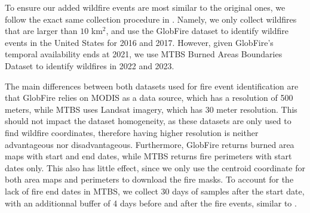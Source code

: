 To ensure our added wildfire events are most similar to the original ones, we follow the exact same collection procedure in \cite{gerard2023wildfirespreadts}. Namely, we only collect wildfires that are larger than $10$ km$^2$, and use the GlobFire dataset \cite{artes2019global} to identify wildfire events in the United States for 2016 and 2017. However, given GlobFire's temporal availability ends at 2021, we use MTBS Burned Areas Boundaries Dataset \cite{MTBS_2017} to identify wildfires in 2022 and 2023.

The main differences between both datasets used for fire event identification are that GlobFire relies on MODIS \cite{giglio2021modis} as a data source, which has a resolution of 500 meters, while MTBS uses Landsat imagery, which has 30 meter resolution. This should not impact the dataset homogeneity, as these datasets are only used to find wildfire coordinates, therefore having higher resolution is neither advantageous nor disadvantageous. Furthermore, GlobFire returns burned area maps with start and end dates, while MTBS returns fire perimeters with start dates only. This also has little effect, since we only use the centroid coordinate for both area maps and perimeters to download the fire masks. To account for the lack of fire end dates in MTBS, we collect 30 days of samples after the start date, with an additionnal buffer of 4 days before and after the fire events, similar to \cite{gerard2023wildfirespreadts}.

